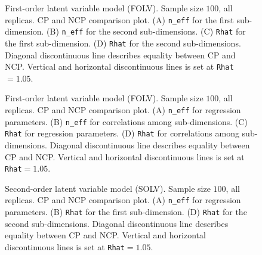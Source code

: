 %
\begin{figure}[h]
	\centering
	\begin{subfigure}
		\texttt{[image: FOLV\_100\_neff3]}
	\end{subfigure}
	\begin{subfigure}
		\texttt{[image: FOLV\_100\_Rhat3]}
	\end{subfigure}
	\caption[First-order latent variable model (FOLV). Sample size $100$, all replicas. CP and NCP comparison plot.]%
	{First-order latent variable model (FOLV). Sample size $100$, all replicas. CP and NCP comparison plot. (A) \texttt{n\_eff} for the first sub-dimension. (B) \texttt{n\_eff} for the second sub-dimensions. (C) \texttt{Rhat} for the first sub-dimension. (D) \texttt{Rhat} for the second sub-dimensions. Diagonal discontinuous line describes equality between CP and NCP. Vertical and horizontal discontinuous lines is set at \texttt{Rhat}$=1.05$. }
	\label{fig:FOLV_stat3}
\end{figure}
%
\begin{figure}[h]
	\centering
	\begin{subfigure}
		\texttt{[image: FOLV\_100\_neff2]}
	\end{subfigure}
	\begin{subfigure}
		\texttt{[image: FOLV\_100\_Rhat2]}
	\end{subfigure}
	\caption[First-order latent variable model (FOLV). Sample size $100$, all replicas. CP and NCP comparison plot.]%
	{First-order latent variable model (FOLV). Sample size $100$, all replicas. CP and NCP comparison plot. (A) \texttt{n\_eff} for regression parameters. (B) \texttt{n\_eff} for correlations among sub-dimensions. (C) \texttt{Rhat} for regression parameters. (D) \texttt{Rhat} for correlations among sub-dimensions. Diagonal discontinuous line describes equality between CP and NCP. Vertical and horizontal discontinuous lines is set at \texttt{Rhat}$=1.05$. }
	\label{fig:FOLV_stat2}
\end{figure}
%
\begin{figure}[h]
	\centering
	\begin{subfigure}
		\texttt{[image: SOLV\_100\_neff2]}
	\end{subfigure}
	\begin{subfigure}
		\texttt{[image: SOLV\_100\_Rhat2]}
	\end{subfigure}
	\caption[Second-order latent variable model (SOLV). Sample size $100$, all replicas. CP and NCP comparison plot.]%
	{Second-order latent variable model (SOLV). Sample size $100$, all replicas. CP and NCP comparison plot. (A) \texttt{n\_eff} for regression parameters. (B) \texttt{Rhat} for the first sub-dimension. (D) \texttt{Rhat} for the second sub-dimensions. Diagonal discontinuous line describes equality between CP and NCP. Vertical and horizontal discontinuous lines is set at \texttt{Rhat}$=1.05$. }
	\label{fig:SOLV_stat1}
\end{figure}

